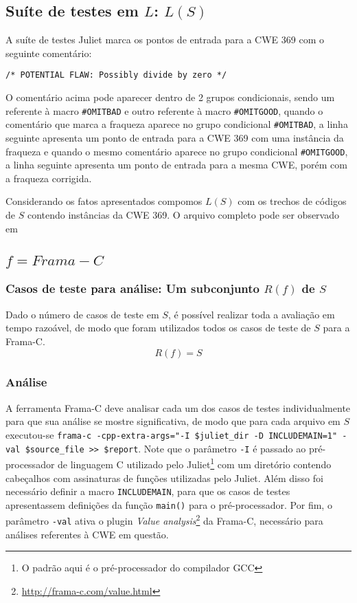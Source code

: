   \subsection{Suíte de testes em $L$: $L(S)$}

  A suíte de testes Juliet marca os pontos de entrada para a CWE 369 com o seguinte comentário:

  \lstinline{/* POTENTIAL FLAW: Possibly divide by zero */}

  O comentário acima pode aparecer dentro de 2 grupos condicionais, sendo um referente à macro \lstinline{#OMITBAD} e outro referente à macro \lstinline{#OMITGOOD}, quando o comentário que marca a fraqueza aparece no grupo condicional \lstinline{#OMITBAD}, a linha seguinte apresenta um ponto de entrada para a CWE 369 com uma instância da fraqueza e quando o mesmo comentário aparece no grupo condicional \lstinline{#OMITGOOD}, a linha seguinte apresenta um ponto de entrada para a mesma CWE, porém com a fraqueza corrigida.

  Considerando os fatos apresentados compomos $L(S)$ com os trechos de códigos de $S$ contendo instâncias da CWE 369. O arquivo completo pode ser observado em 

  \subsection{$f = Frama-C$}
  \subsubsection{Casos de teste para análise: Um subconjunto $R(f)$ de $S$}

  Dado o número de casos de teste em $S$, é possível realizar toda a avaliação em tempo razoável, de modo que foram utilizados todos os casos de teste de $S$ para a Frama-C.
  \begin{equation}
    R(f) = S
  \end{equation}

  \subsubsection{Análise}

  A ferramenta Frama-C deve analisar cada um dos casos de testes individualmente para que sua análise se mostre significativa, de modo que para cada arquivo em $S$ executou-se
  \lstinline[mathescape=false]{frama-c -cpp-extra-args="-I $juliet_dir -D INCLUDEMAIN=1" -val $source_file >> $report}.
  Note que o parâmetro \lstinline{-I} é passado ao pré-processador de linguagem C utilizado pelo Juliet\footnote{O padrão aqui é o pré-processador do compilador GCC} com um diretório contendo cabeçalhos com assinaturas de funções utilizadas pelo Juliet. Além disso foi necessário definir a macro \lstinline{INCLUDEMAIN}, para que os casos de testes apresentassem definições da função \lstinline{main()} para o pré-processador. Por fim, o parâmetro \lstinline{-val} ativa o plugin \textit{Value analysis}\footnote{\url{http://frama-c.com/value.html}} da Frama-C, necessário para análises referentes à CWE em questão.

